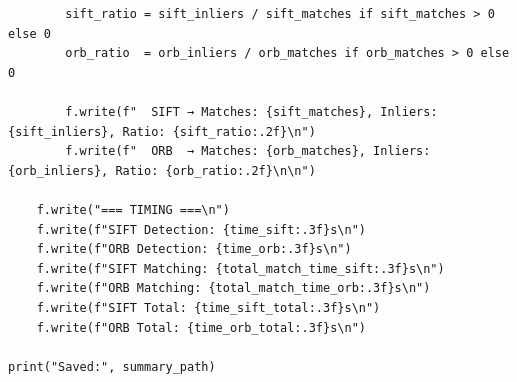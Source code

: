 \documentclass[a4paper,12pt]{article}
\begin{document}
\begin{lstlisting}
        sift_ratio = sift_inliers / sift_matches if sift_matches > 0 else 0
        orb_ratio  = orb_inliers / orb_matches if orb_matches > 0 else 0

        f.write(f"  SIFT → Matches: {sift_matches}, Inliers: {sift_inliers}, Ratio: {sift_ratio:.2f}\n")
        f.write(f"  ORB  → Matches: {orb_matches}, Inliers: {orb_inliers}, Ratio: {orb_ratio:.2f}\n\n")

    f.write("=== TIMING ===\n")
    f.write(f"SIFT Detection: {time_sift:.3f}s\n")
    f.write(f"ORB Detection: {time_orb:.3f}s\n")
    f.write(f"SIFT Matching: {total_match_time_sift:.3f}s\n")
    f.write(f"ORB Matching: {total_match_time_orb:.3f}s\n")
    f.write(f"SIFT Total: {time_sift_total:.3f}s\n")
    f.write(f"ORB Total: {time_orb_total:.3f}s\n")

print("Saved:", summary_path)
\end{lstlisting}
\end{document}
